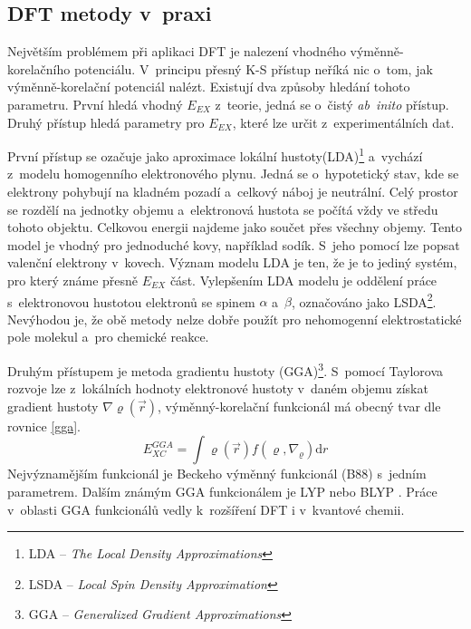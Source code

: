 \documentclass[
digital, %
table,   %
nolof,     %
nolot,     %
oneside,
]{fithesis3}
\begin{document}
\subsection{DFT metody v~praxi}
Největším problémem při aplikaci DFT je nalezení vhodného výměnně-korelačního potenciálu. V~principu přesný K-S přístup neříká nic o~tom, jak výměnně-korelační potenciál nalézt. Existují dva způsoby hledání tohoto parametru. První hledá vhodný $E_{EX}$ z~teorie, jedná se o~čistý \textit{ab~inito} přístup. Druhý přístup hledá parametry pro $E_{EX}$, které lze určit z~experimentálních dat.

První přístup se ozačuje jako aproximace lokální hustoty(LDA)\footnote{LDA -- \textit{The Local Density Approximations}} a~vychází z~modelu homogenního elektronového plynu. Jedná se o~hypotetický stav, kde se elektrony pohybují na kladném pozadí a~celkový náboj je neutrální. Celý prostor se rozdělí na jednotky objemu a~elektronová hustota se počítá vždy ve středu tohoto objektu. Celkovou energii najdeme jako součet přes všechny objemy. Tento model je vhodný pro jednoduché kovy, například sodík. S~jeho pomocí lze popsat valenční elektrony v~kovech. Význam modelu LDA je ten, že je to jediný systém, pro který známe přesně $E_{EX}$ část. Vylepšením LDA modelu je oddělení práce s~elektronovou hustotou elektronů se spinem $\alpha$ a~$\beta$, označováno jako LSDA\footnote{LSDA -- \textit{Local Spin Density Approximation}}. Nevýhodou je, že obě metody nelze dobře použít pro nehomogenní elektrostatické pole molekul a~pro chemické reakce.

Druhým přístupem je metoda gradientu hustoty (GGA)\footnote{GGA -- \textit{Generalized Gradient Approximations}}. S~pomocí Taylorova rozvoje lze z~lokálních hodnoty elektronové hustoty v~daném objemu získat gradient hustoty $\nabla \varrho(\vec{r})$, výměnný-korelační funkcionál má obecný tvar dle rovnice \ref{gga}.
\begin{equation}
E_{XC}^{GGA} = \int \varrho(\vec{r})f(\varrho, \nabla_{\varrho})\mathrm{d}r
\label{gga}
\end{equation}
Nejvýznamějším funkcionál je Beckeho výměnný funkcionál (B88)\cite{b88} s~jedním parametrem. Dalším známým GGA funkcionálem je LYP \cite{lyp} nebo BLYP \cite{blyp}. Práce v~oblasti GGA funkcionálů vedly k~rozšíření DFT i v~kvantové chemii.
\end{document}
